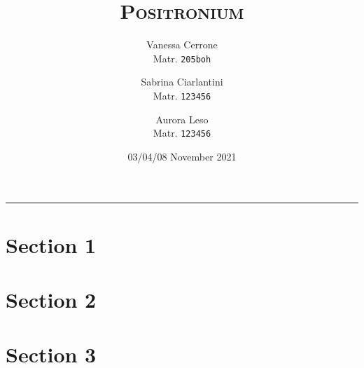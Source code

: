 

\let\origautoref\autoref
\def\autoref#1{{\origautoref{#1}}}


\def\sectionautorefname{Section}
\def\subsectionautorefname{Section}
\def\subsubsectionautorefname{Section}

\author{
  Vanessa Cerrone\\
  Matr. \texttt{205boh}
  \and
  Sabrina Ciarlantini\\
  Matr. \texttt{123456}
  \and
  Aurora Leso\\
  Matr. \texttt{123456}
}
\title{\Huge{\textsc{\bf{Positronium}}}}
\date{03/04/08 November 2021}



\def\sectionautorefname{Section}
\def\subsectionautorefname{Section}
\def\subsubsectionautorefname{Section}


  \maketitle
  \rule{\linewidth}{0.4pt}


  \section{Section 1} 
  \label{sec:section1} 
   

  \section{Section 2} 
  \label{sec:section2} 
   

  \section{Section 3} 
  \label{sec:section3} 
   





